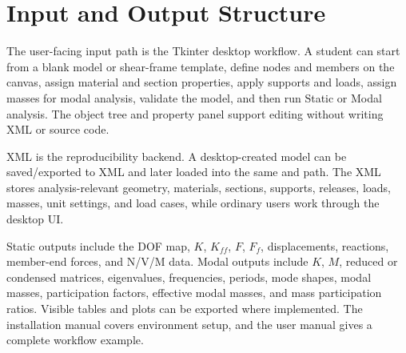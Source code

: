 \section{Input and Output Structure}

The user-facing input path is the Tkinter desktop workflow. A student can start from a blank model or shear-frame template, define nodes and members on the canvas, assign material and section properties, apply supports and loads, assign masses for modal analysis, validate the model, and then run Static or Modal analysis. The object tree and property panel support editing without writing XML or source code.

XML is the reproducibility backend. A desktop-created model can be saved/exported to XML and later loaded into the same  and  path. The XML stores analysis-relevant geometry, materials, sections, supports, releases, loads, masses, unit settings, and load cases, while ordinary users work through the desktop UI.

Static outputs include the DOF map, \(K\), \(K_{ff}\), \(F\), \(F_f\), displacements, reactions, member-end forces, and N/V/M data. Modal outputs include \(K\), \(M\), reduced or condensed matrices, eigenvalues, frequencies, periods, mode shapes, modal masses, participation factors, effective modal masses, and mass participation ratios. Visible tables and plots can be exported where implemented. The installation manual covers environment setup, and the user manual gives a complete workflow example.
